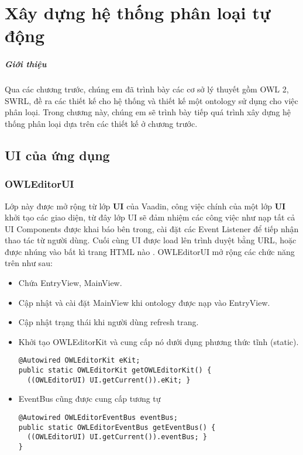 \chapter{Xây dựng hệ thống phân loại tự động}
\paragraph{Giới thiệu} Qua các chương trước, chúng em đã trình bày các cơ sở lý thuyết gồm OWL 2, SWRL, đề ra các thiết kế cho hệ thống và thiết kế một ontology sử dụng cho việc phân loại. Trong chương này, chúng em sẽ trình bày tiếp quá trình xây dựng hệ thống phân loại dựa trên các thiết kế ở chương trước.
\section{UI của ứng dụng}
\subsection{OWLEditorUI}
Lớp này được mở rộng từ lớp \textbf{UI} của Vaadin, công việc chính của một lớp \textbf{UI} khởi tạo các  giao diện, từ đây lớp UI sẽ đảm nhiệm các công việc như nạp tất cả UI Components được khai báo bên trong, cài đặt các Event Listener để tiếp nhận thao tác từ người dùng. Cuối cùng UI được load lên trình duyệt bằng URL, hoặc được nhúng vào bất kì trang HTML nào \cite{vaadinarchitecture}. OWLEditorUI mở rộng các chức năng trên như sau:
\begin{itemize}
\item Chứa EntryView, MainView.
\item Cập nhật và cài đặt MainView khi ontology được nạp vào EntryView.
\item Cập nhật trạng thái khi người dùng refresh trang.
\item Khởi tạo OWLEditorKit và cung cấp nó dưới dụng phương thức tĩnh (static).
\begin{verbatim}
@Autowired OWLEditorKit eKit;
public static OWLEditorKit getOWLEditorKit() {
  ((OWLEditorUI) UI.getCurrent()).eKit; }
\end{verbatim}
\item EventBus cũng được cung cấp tương tự 
\begin{verbatim}
@Autowired OWLEditorEventBus eventBus;
public static OWLEditorEventBus getEventBus() {
  ((OWLEditorUI) UI.getCurrent()).eventBus; }	
}
\end{verbatim}
\end{itemize}
